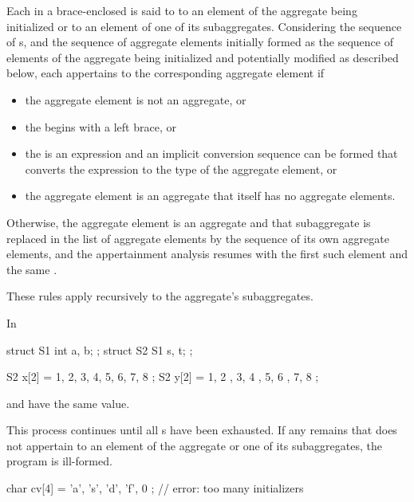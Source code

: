 \pnum
Each  in
a brace-enclosed 
is said to 
to an element of the aggregate being initialized or
to an element of one of its subaggregates.
Considering the sequence of s,
and the sequence of aggregate elements
initially formed as the sequence of elements of the aggregate being initialized
and potentially modified as described below,
each  appertains to
the corresponding aggregate element if
\begin{itemize}
\item
the aggregate element is not an aggregate, or
\item
the  begins with a left brace, or
\item
the  is an expression and
an implicit conversion sequence can be formed
that converts the expression to the type of the aggregate element, or
\item
the aggregate element is an aggregate that itself has no aggregate elements.
\end{itemize}
Otherwise,
the aggregate element is an aggregate and
that subaggregate is replaced in the list of aggregate elements by
the sequence of its own aggregate elements, and
the appertainment analysis resumes with
the first such element and the same .
\begin{note}
These rules apply recursively to the aggregate's subaggregates.
\begin{example}
In
\begin{codeblock}
struct S1 { int a, b; };
struct S2 { S1 s, t; };

S2 x[2] = { 1, 2, 3, 4, 5, 6, 7, 8 };
S2 y[2] = {
  {
    { 1, 2 },
    { 3, 4 }
  },
  {
    { 5, 6 },
    { 7, 8 }
  }
};
\end{codeblock}
 and  have the same value.
\end{example}
\end{note}
This process continues
until all s have been exhausted.
If any  remains
that does not appertain to
an element of the aggregate or one of its subaggregates,
the program is ill-formed.
\begin{example}
\begin{codeblock}
char cv[4] = { 'a', 's', 'd', 'f', 0 };     // error: too many initializers
\end{codeblock}
\end{example}

